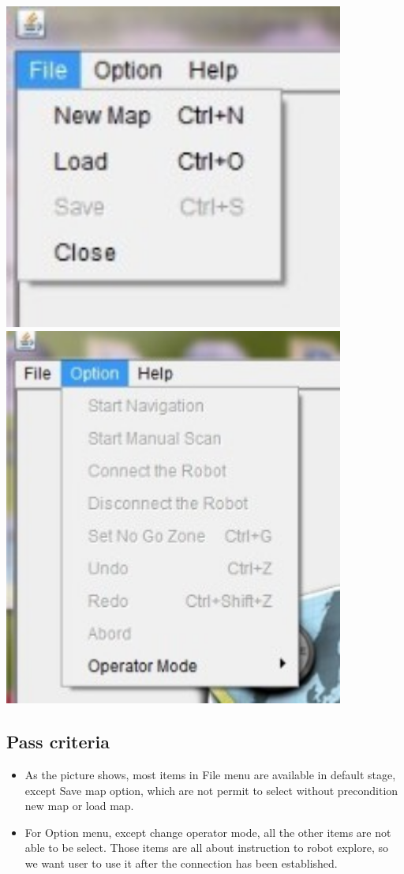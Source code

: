\documentclass[11pt, a4paper]{report}
\begin{document}
 \begin{center}
 \includegraphics[width=11.20cm]{FileMenuDefault}
 \includegraphics[width=11.20cm]{OptionMenuDefault}
\end{center}
\subsection{Pass criteria}
\begin{itemize}
\item As the picture shows, most items in File menu are available in default stage, except Save map option, which are not permit to select without precondition new map or load map.
\item For Option menu, except change operator mode, all the other items are not able to be select. Those items are all about instruction to robot explore, so we want user to use it after the connection has been established.  
\end{itemize}
\end{document}
